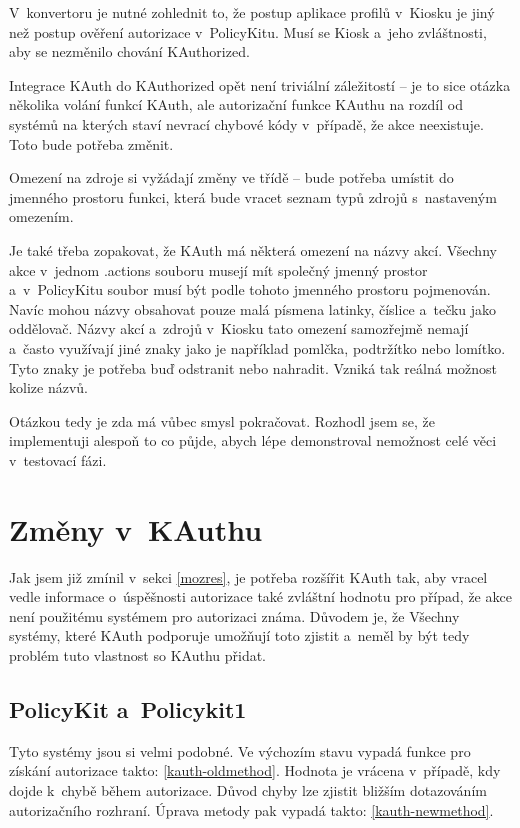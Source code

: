 V~konvertoru je nutné zohlednit to, že postup aplikace profilů v~Kiosku je jiný než postup ověření autorizace v~PolicyKitu. Musí se  Kiosk a~jeho zvláštnosti, aby se nezměnilo chování KAuthorized.

Integrace KAuth do KAuthorized opět není triviální záležitostí -- je to sice otázka několika volání funkcí KAuth, ale autorizační funkce KAuthu na rozdíl od systémů na kterých staví nevrací chybové kódy v~případě, že akce neexistuje. Toto bude potřeba změnit.

Omezení na zdroje  si vyžádají změny ve třídě  -- bude potřeba umístit do jmenného prostoru  funkci, která bude vracet seznam typů zdrojů s~nastaveným omezením.

Je také třeba zopakovat, že KAuth má některá omezení na názvy akcí. Všechny akce v~jednom .actions souboru musejí mít společný jmenný prostor a~v~PolicyKitu soubor musí být podle tohoto jmenného prostoru pojmenován. Navíc mohou názvy obsahovat pouze malá písmena latinky, číslice a~tečku jako oddělovač. Názvy akcí a~zdrojů v~Kiosku tato omezení samozřejmě nemají a~často využívají jiné znaky jako je například pomlčka, podtržítko nebo lomítko. Tyto znaky je potřeba buď odstranit nebo nahradit. Vzniká tak reálná možnost kolize názvů.

Otázkou tedy je zda má vůbec smysl pokračovat. Rozhodl jsem se, že implementuji alespoň to co půjde, abych lépe demonstroval nemožnost celé věci v~testovací fázi.
\section{Změny v~KAuthu}
Jak jsem již zmínil v~sekci \ref{mozres}, je potřeba rozšířit KAuth tak, aby vracel vedle informace o~úspěšnosti autorizace také zvláštní hodnotu pro případ, že akce není použitému systémem pro autorizaci známa. Důvodem je, že  Všechny systémy, které KAuth podporuje umožňují toto zjistit a~neměl by být tedy problém tuto vlastnost so KAuthu přidat.
\subsection*{PolicyKit a~Policykit1}
Tyto systémy jsou si velmi podobné. Ve výchozím stavu vypadá funkce pro získání autorizace takto: \ref{kauth-oldmethod}. Hodnota  je vrácena v~případě, kdy dojde k~chybě během autorizace. Důvod chyby lze zjistit bližším dotazováním autorizačního rozhraní. Úprava metody pak vypadá takto: \ref{kauth-newmethod}.

